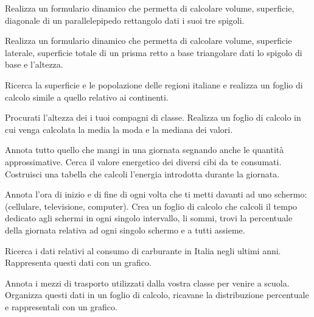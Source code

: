 \begin{esercizio}
Realizza un formulario dinamico che permetta di calcolare volume,
superficie, diagonale di un parallelepipedo rettangolo
dati i suoi tre spigoli.
\end{esercizio}

\begin{esercizio}
Realizza un formulario dinamico che permetta di calcolare volume,
superficie laterale, superficie totale di un prisma retto a base
triangolare
dati lo spigolo di base e l'altezza.
\end{esercizio}

\begin{esercizio}
Ricerca la superficie e le popolazione delle regioni italiane e realizza
un foglio di calcolo simile a quello relativo ai continenti.
\end{esercizio}

\begin{esercizio}
Procurati l'altezza dei i tuoi compagni di classe. Realizza un
foglio di calcolo in cui venga calcolata la media la moda e la mediana
dei valori.
\end{esercizio}

\begin{esercizio}
Annota tutto quello che mangi in una giornata segnando anche le quantità
approssimative. Cerca il valore energetico dei diversi cibi da te
consumati. Costruisci una tabella che calcoli l'energia introdotta
durante la giornata.
\end{esercizio}

\begin{esercizio}
Annota l'ora di inizio e di fine di ogni volta che ti metti davanti ad
uno schermo: (cellulare, televisione, computer).
Crea un foglio di calcolo che calcoli il tempo dedicato agli schermi in
ogni singolo intervallo, li sommi, trovi la percentuale della giornata
relativa ad ogni singolo schermo e a tutti assieme.
\end{esercizio}

\begin{esercizio}
Ricerca i dati relativi al consumo di carburante in Italia negli ultimi
anni. Rappresenta questi dati con un grafico.
\end{esercizio}

\begin{esercizio}
Annota i mezzi di trasporto utilizzati dalla vostra classe per venire
a scuola. Organizza questi dati in un foglio di calcolo, ricavane
la distribuzione percentuale e rappresentali con un grafico.
\end{esercizio}

